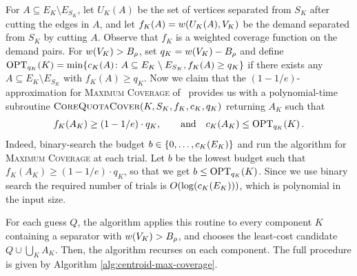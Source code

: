 For $A\subseteq E_K\setminus E_{S_K}$, let $U_K(A)$ be the set of vertices separated from $S_K$ after cutting the edges in $A$, and let
$
    f_K(A)=w\mathopen{}\left( U_K(A), V_K \right)
$
be the demand separated from $S_K$ by cutting $A$.
Observe that $f_K$ is a weighted coverage function on the demand pairs. 
For $w\mathopen{}\left( V_K \right)>B_\rho$, set $q_K=w\mathopen{}\left( V_K \right)-B_\rho$ and define
$
    \textup{OPT}_{q_K}\mathopen{}\left( K \right)
    =\min\mathopen{}\left\{ c_K(A)\colon A\subseteq E_K\setminus E_{S_K},f_K(A)\geq q_K \right\}
$
if there exists any $A\subseteq E_K\setminus E_{S_K}$ with $f_K(A)\geq q_K$.  Now we claim that the $ (1-1/e)$-approximation for \textsc{Maximum Coverage} of~\cite{KhullerMossNaor1999BudgetedMaximumCoverage} provides us with a polynomial-time subroutine $\textsc{CoreQuotaCover}(K,S_K,f_K,c_K,q_K)$ returning $A_K$ such that
\[
    f_K(A_K)\geq(1-1/e)\cdot q_K,\quad \quad\text{and}\quad
    c_K(A_K)\leq\textup{OPT}_{q_K}\mathopen{}\left( K \right).
\]
Indeed, binary-search the budget $b\in \mathopen{}\left\{ 0,\dots, c_K(E_K) \right\}$ and run the algorithm for \textsc{Maximum Coverage} at each trial.
Let $b$ be the lowest budget such that $f_K(A_K)\geq(1-1/e)\cdot q_K$, so that we get $b\leq \textup{OPT}_{q_K}\mathopen{}\left( K \right)$.
 Since we use binary search the required number of trials is $O\mathopen{}\left( \log\mathopen{}\left( c_K(E_K) \right) \right)$, which is polynomial in the input size.

For each guess $Q$, the algorithm applies this routine to every component $K$ containing a separator with $w\mathopen{}\left( V_K \right)>B_\rho$, and chooses the least-cost candidate $Q\cup\bigcup_K A_K$. Then, the algorithm recurses on each component. The full procedure is given by Algorithm \ref{alg:centroid-max-coverage}.



